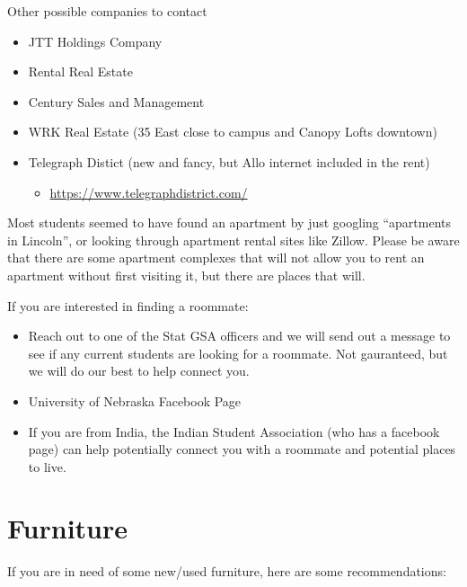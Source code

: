 \documentclass[
  12pt,
]{book}
\providecommand{\tightlist}{%
  \setlength{\itemsep}{0pt}\setlength{\parskip}{0pt}}
\begin{document}
Other possible companies to contact

\begin{itemize}
\tightlist
\item
  JTT Holdings Company
\item
  Rental Real Estate
\item
  Century Sales and Management
\item
  WRK Real Estate (35 East close to campus and Canopy Lofts downtown)
\item
  Telegraph Distict (new and fancy, but Allo internet included in the rent)

  \begin{itemize}
  \tightlist
  \item
    \url{https://www.telegraphdistrict.com/}
  \end{itemize}
\end{itemize}

Most students seemed to have found an apartment by just googling ``apartments in Lincoln'', or looking through apartment rental sites like Zillow. Please be aware that there are some apartment complexes that will not allow you to rent an apartment without first visiting it, but there are places that will.

If you are interested in finding a roommate:

\begin{itemize}
\tightlist
\item
  Reach out to one of the Stat GSA officers and we will send out a message to see if any current students are looking for a roommate. Not gauranteed, but we will do our best to help connect you.
\item
  University of Nebraska Facebook Page
\item
  If you are from India, the Indian Student Association (who has a facebook page) can help potentially connect you with a roommate and potential places to live.
\end{itemize}

\hypertarget{furniture}{%
\section{Furniture}\label{furniture}}

If you are in need of some new/used furniture, here are some recommendations:
\end{document}
